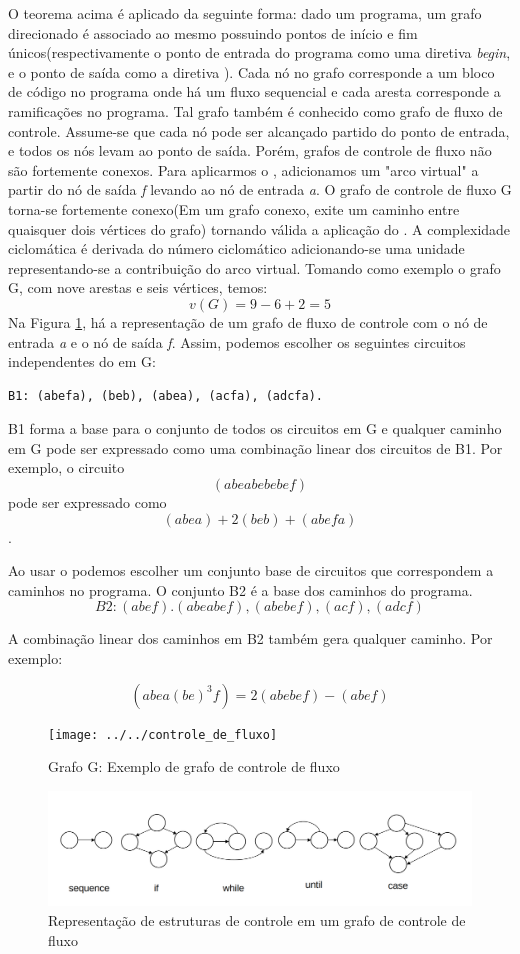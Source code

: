 O teorema acima é aplicado da seguinte forma: dado um programa, um grafo direcionado é associado ao mesmo possuindo pontos de início e fim únicos(respectivamente o ponto de entrada do programa como uma diretiva \textit{begin}, e o ponto de saída como a diretiva ). Cada nó no grafo corresponde a um bloco de código no programa onde há um fluxo sequencial e cada aresta corresponde a ramificações no programa. Tal grafo também é conhecido como grafo de fluxo de controle. Assume-se que cada nó pode ser alcançado partido do ponto de entrada, e todos os nós levam ao ponto de saída. Porém, grafos de controle de fluxo não são fortemente conexos. Para aplicarmos o , adicionamos um "arco virtual" a partir do nó de saída \textit{f} levando ao nó de entrada \textit{a}. O grafo de controle de fluxo G torna-se fortemente conexo(Em um grafo conexo, exite um caminho entre quaisquer dois vértices do grafo) tornando válida a aplicação do . A complexidade ciclomática é derivada do número ciclomático adicionando-se uma unidade representando-se a contribuição do arco virtual\cite{watson1996structured}. Tomando como exemplo o grafo G, com nove arestas e seis vértices, temos:
\[v(G) = 9 - 6 + 2 = 5\]
Na Figura \ref{fig:grafo-de-controle-de-fluxo}, há a representação de um grafo de fluxo de controle com o nó de entrada \textit{a} e o nó de saída \textit{f}. 
Assim, podemos escolher os seguintes circuitos independentes do em G:
\begin{verbatim}
B1: (abefa), (beb), (abea), (acfa), (adcfa).
\end{verbatim}
B1 forma a base para o conjunto de todos os circuitos em G e qualquer caminho em G pode ser expressado como uma combinação linear dos circuitos de B1. Por exemplo, o circuito \[(abeabebebef)\] pode ser expressado como \[(abea)+2(beb)+(abefa)\]. 

Ao usar o  podemos escolher um conjunto base de circuitos que correspondem a caminhos no programa. O conjunto B2 é a base dos caminhos do programa.
\[B2: (abef).(abeabef),(abebef),(acf),(adcf)\]

A combinação linear dos caminhos em B2 também gera qualquer caminho. Por exemplo:

\[(abea(be)^3f) = 2(abebef) - (abef)\]


\begin{figure}
	\centering
	\texttt{[image: ../../controle\_de\_fluxo]}
	\caption{Grafo G: Exemplo de grafo de controle de fluxo}
	\label{fig:grafo-de-controle-de-fluxo}
\end{figure}
\begin{figure}
	\centering
	\includegraphics[width=0.5\linewidth]{figure/fluxo_estruturas}
	\caption{Representação de estruturas de controle em um grafo de controle de fluxo}
	\label{fig:fluxoestruturas}
\end{figure}

